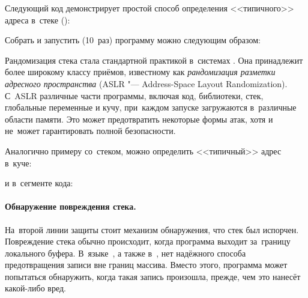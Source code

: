Следующий код демонстрирует простой способ определения <<типичного>> адреса в~стеке ():


Собрать и запустить (10~раз) программу можно следующим образом:


Рандомизация стека стала стандартной практикой в~системах . Она принадлежит более широкому классу приёмов, известному как \emph{рандомизация разметки адресного пространства} (\textenglish{ASLR "--- Address-Space Layout Randomization}). С~\textenglish{ASLR} различные части программы, включая код, библиотеки, стек, глобальные переменные и кучу, при~каждом запуске загружаются в~различные области памяти. Это может предотвратить некоторые формы атак, хотя и не~может гарантировать полной безопасности.

Аналогично примеру со~стеком, можно определить <<типичный>> адрес в~куче:


\noindent и в~сегменте кода:




\paragraph{Обнаружение повреждения стека.}
На~второй линии защиты стоит механизм обнаружения, что стек был испорчен. Повреждение стека обычно происходит, когда программа выходит за~границу локального буфера. В~языке~, а также в~, нет надёжного способа предотвращения записи вне границ массива. Вместо этого, программа может попытаться обнаружить, когда такая запись произошла, прежде, чем это нанесёт какой-либо вред.

